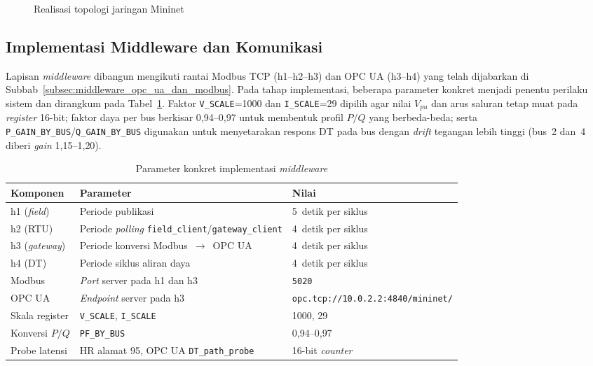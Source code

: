 \begin{figure}[htbp]
    \centering
    \caption{Realisasi topologi jaringan Mininet}
    \label{fig:impl_topologi}
\end{figure}

\subsection{Implementasi Middleware dan Komunikasi}
\label{subsec:implementasi_middleware_dan_komunikasi}
Lapisan \textit{middleware} dibangun mengikuti rantai Modbus TCP (h1--h2--h3) dan OPC UA (h3--h4) yang telah dijabarkan di Subbab~\ref{subsec:middleware_opc_ua_dan_modbus}. Pada tahap implementasi, beberapa parameter konkret menjadi penentu perilaku sistem dan dirangkum pada Tabel~\ref{tab:impl_param_middleware}. Faktor \texttt{V\_SCALE}=1000 dan \texttt{I\_SCALE}=29 dipilih agar nilai $V_{pu}$ dan arus saluran tetap muat pada \textit{register} 16-bit; faktor daya per bus berkisar 0{,}94--0{,}97 untuk membentuk profil $P/Q$ yang berbeda-beda; serta \texttt{P\_GAIN\_BY\_BUS}/\texttt{Q\_GAIN\_BY\_BUS} digunakan untuk menyetarakan respons \ac{DT} pada bus dengan \textit{drift} tegangan lebih tinggi (bus~2 dan~4 diberi \textit{gain} 1{,}15--1{,}20).

\renewcommand{\arraystretch}{1.3}
\begin{table}[htbp]
    \centering
    \caption{Parameter konkret implementasi \textit{middleware}}
    \label{tab:impl_param_middleware}
    \begin{tabular}{|l|l|l|}
        \hline
        \textbf{Komponen} & \textbf{Parameter} & \textbf{Nilai} \\ \hline
        h1 (\textit{field}) & Periode publikasi & 5~detik per siklus \\ \hline
        h2 (RTU) & Periode \textit{polling} \texttt{field\_client}/\texttt{gateway\_client} & 4~detik per siklus \\ \hline
        h3 (\textit{gateway}) & Periode konversi Modbus~$\to$~OPC UA & 4~detik per siklus \\ \hline
        h4 (\ac{DT}) & Periode siklus aliran daya & 4~detik per siklus \\ \hline
        Modbus & \textit{Port} server pada h1 dan h3 & \texttt{5020} \\ \hline
        OPC UA & \textit{Endpoint} server pada h3 & \texttt{opc.tcp://10.0.2.2:4840/mininet/} \\ \hline
        Skala register & \texttt{V\_SCALE}, \texttt{I\_SCALE} & 1000, 29 \\ \hline
        Konversi $P/Q$ & \texttt{PF\_BY\_BUS} & 0{,}94--0{,}97 \\ \hline
        Probe latensi & \ac{HR} alamat 95, OPC UA \texttt{DT\_path\_probe} & 16-bit \textit{counter} \\ \hline
    \end{tabular}
\end{table}

